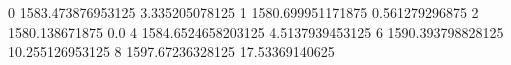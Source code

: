 0 1583.473876953125 3.335205078125
1 1580.699951171875 0.561279296875
2 1580.138671875 0.0
4 1584.6524658203125 4.5137939453125
6 1590.393798828125 10.255126953125
8 1597.67236328125 17.53369140625
